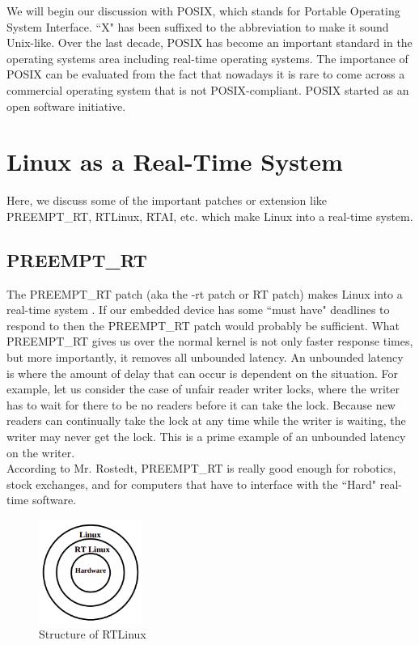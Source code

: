 \documentclass[12pt]{report}
\begin{document}
We will begin our discussion with POSIX, which stands for Portable Operating System Interface. ``X" has been suffixed to the  abbreviation to make it sound Unix-like. Over the last decade, POSIX has become an important standard in the operating systems area including real-time operating systems. The importance of  POSIX can be evaluated from the fact that nowadays it is rare to come across a commercial operating system that is not POSIX-compliant. POSIX started as an open software initiative.

\section{Linux as a Real-Time System}
Here, we discuss some of the important patches or extension like PREEMPT\_RT, RTLinux, RTAI, etc. which make Linux into a real-time system. 
\subsection{PREEMPT\_RT}
The PREEMPT\_RT patch (aka the -rt patch or RT patch) makes Linux into a real-time system \cite{rtlinux}. If our embedded device has some ``must have" deadlines to respond to then the PREEMPT\_RT patch would probably be sufficient. What PREEMPT\_RT gives us over the normal kernel is not only faster response times, but more importantly, it removes all unbounded latency. An unbounded latency is where the amount of delay that can occur is dependent on the situation. For example, let us consider the case of unfair reader writer locks, where the writer has to wait for there to be no readers before it can take the lock. Because new readers can continually take the lock at any time while the writer is waiting, the writer may never get the lock. This is a prime example of an unbounded latency on the writer.\\

According to Mr. Rostedt, PREEMPT\_RT is really good enough for robotics, stock exchanges, and for computers that have to interface with the ``Hard" real-time software.

\begin{figure}[h]
\centering
\includegraphics[width=0.3\textwidth]{images/rtlinux.png}
\caption{Structure of RTLinux}
\label{fig:rt-linux}
\end{figure}
\end{document}
